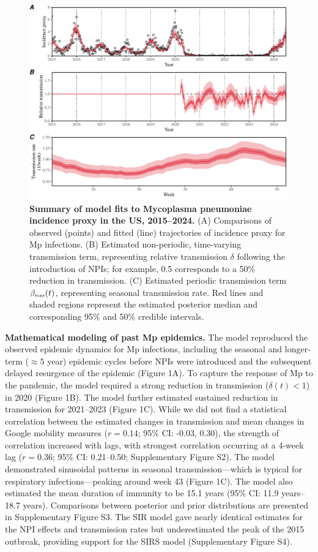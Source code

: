 \documentclass[12pt]{article}
\newcommand{\tsub}[2]{#1_{{\textrm{\tiny #2}}}}
\begin{document}
\begin{figure}[!ht]
\includegraphics[width=\textwidth]{../figure1/figure1_new.pdf}
\caption{
\textbf{Summary of model fits to Mycoplasma pneumoniae incidence proxy in the US, 2015--2024.}
(A) Comparisons of observed (points) and fitted (line) trajectories of incidence proxy for Mp infections.
(B) Estimated non-periodic, time-varying transmission term, representing relative transmission $\delta$ following the introduction of NPIs; 
for example, 0.5 corresponds to a 50\% reduction in transmission.
(C) Estimated periodic transmission term  $\tsub{\beta}{seas}(t)$, representing seasonal transmission rate.
Red lines and shaded regions represent the estimated posterior median and corresponding 95\% and 50\% credible intervals.
}
\end{figure}

\textbf{Mathematical modeling of past Mp epidemics.}
The model reproduced the observed epidemic dynamics for Mp infections, including the seasonal and longer-term ($\approx 5$ year) epidemic cycles before NPIs were introduced and the subsequent delayed resurgence of the epidemic (Figure 1A).
To capture the response of Mp to the pandemic, the model required a strong reduction in transmission ($\delta(t) < 1$) in 2020 (Figure 1B).
The model further estimated sustained reduction in transmission for 2021--2023 (Figure 1C).
While we did not find a statistical correlation between the estimated changes in transmission and mean changes in Google mobility measures ($r=0.14$; 95\% CI: -0.03, 0.30),
the strength of correlation increased with lags, with strongest correlation occurring at a 4-week lag  ($r=0.36$; 95\% CI: 0.21--0.50; Supplementary Figure S2).
The model demonstrated sinusoidal patterns in seasonal transmission---which is typical for respiratory infections---peaking around week 43 (Figure 1C).
The model also estimated the mean duration of immunity to be 15.1 years (95\% CI: 11.9 years--18.7 years).
Comparisons between posterior and prior distributions are presented in Supplementary Figure S3. 
The SIR model gave nearly identical estimates for the NPI effects and transmission rates but underestimated the peak of the 2015 outbreak, providing support for the SIRS model (Supplementary Figure S4).
\end{document}

